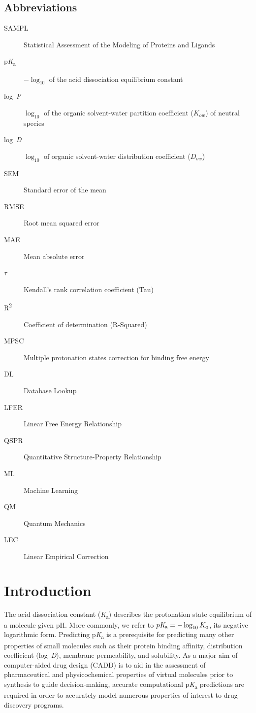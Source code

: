 \documentclass[9pt,lineno,final]{elife}
\newcommand{\pKa}{p\textit{K}\textsubscript{a}}
\newcommand{\logD}{log~\textit{D}}
\newcommand{\logP}{log~\textit{P}}
\begin{document}
\subsection*{Abbreviations}
\begin{description}
\item[SAMPL] Statistical Assessment of the Modeling of Proteins and Ligands
\item[\pKa]  $-\log_{10}$ of the acid dissociation equilibrium constant 
\item[\logP] $\log_{10}$ of the organic solvent-water partition coefficient ($K_{ow}$) of neutral species
\item[\logD] $\log_{10}$ of organic solvent-water distribution coefficient ($D_{ow}$)
\item[SEM] Standard error of the mean
\item[RMSE] Root mean squared error
\item[MAE] Mean absolute error
\item[{$\tau$}] Kendall's rank correlation coefficient (Tau)
\item[R\textsuperscript{2}] Coefficient of determination (R-Squared)
\item[MPSC] Multiple protonation states correction for binding free energy
\item[DL] Database Lookup
\item[LFER] Linear Free Energy Relationship
\item[QSPR] Quantitative Structure-Property Relationship
\item[ML] Machine Learning
\item[QM] Quantum Mechanics
\item[LEC] Linear Empirical Correction
\end{description}


\section{Introduction}

The acid dissociation constant (\textit{K}\textsubscript{a}) describes the protonation state equilibrium of a molecule given pH.
More commonly, we refer to $\pKa{} = -\log_{10} K_a$, its negative logarithmic form. 
Predicting \pKa{} is a prerequisite for predicting many other properties of small molecules such as their protein binding affinity, distribution coefficient (\logD{}), membrane permeability, and solubility. 
As a major aim of computer-aided drug design (CADD) is to aid in the assessment of pharmaceutical and physicochemical properties of virtual molecules prior to synthesis to guide decision-making, accurate computational \pKa{} predictions are required in order to accurately model numerous properties of interest to drug discovery programs.
\end{document}
